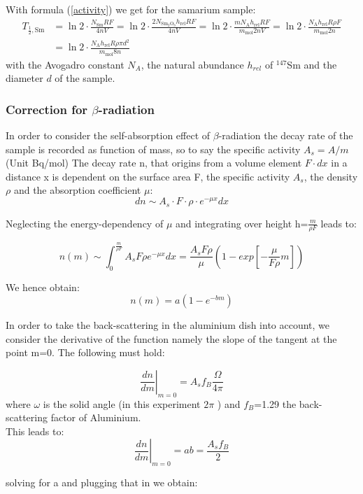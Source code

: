 \documentclass[12pt]{article}
\begin{document}
With formula (\ref{activity}) we get for the samarium sample:
\begin{align}
	T_{\frac12,\text{Sm}}&=\ln2\cdot\frac{N_{\text{Sm}}RF}{4nV}=\ln2\cdot\frac{2N_{\text{Sm$_2$O$_3$}}h_{\text{rel}}RF}{4nV}=\ln2\cdot\frac{mN_{\text{A}}h_{\text{rel}}RF}{m_{\text{mol}}2nV}
	=\ln2\cdot\frac{N_{\text{A}}h_{\text{rel}}R\rho F}{m_{\text{mol}}2n}\\&
	 =\ln2\cdot\frac{N_{\text{A}}h_{\text{rel}}R\rho\pi d^2}{m_{\text{mol}}8n}\label{halflifeSm}
\end{align}
with the Avogadro constant $N_A$, the natural abundance $h_{rel}$ of $^{147}$Sm and the diameter $d$ of the sample.

\subsubsection{Correction for $\beta$-radiation}\label{betacorrection}

In order to consider the self-absorption effect of $\beta$-radiation the decay rate of the sample is recorded as function of mass, so to say the specific activity  $A_s=A/m$ (Unit Bq/mol)
The decay rate n, that origins from a volume element $F\cdot dx$ in a distance x is dependent on the surface area F, the specific activity $A_s$, the density $\rho$ and the absorption coefficient  $\mu$:  
\[dn\sim A_s\cdot F\cdot \rho\cdot e^{-\mu x}dx\]

Neglecting the energy-dependency of $\mu$ and integrating over height  h=$\frac{m}{\rho F}$ leads to:

\[n(m)\sim\int_{0}^{\frac{m}{\rho F}}A_s F\rho e^{-\mu x}dx = \frac{A_s F\rho}{\mu}\left( 1-exp\left[ -\frac{\mu}{F\rho}m\right] \right)\]

We hence obtain:
\[n(m)= a\left( 1-e^{-bm}\right)\]

In order to take the back-scattering in the aluminium dish into account, we consider the derivative of the function namely the slope of the tangent at the point m=0. The following must hold: 

\[\left. \frac{dn}{dm}\right| _{m=0}=A_s f_B \frac{\Omega}{4\pi}\]
where $\omega$ is the solid angle (in this experiment $2\pi$ )  and $f_B$=1.29 the back-scattering factor of Aluminium.\\

This leads to:
\[\left. \frac{dn}{dm}\right| _{m=0} = ab = \frac{A_s f_B}{2}\]

solving for a and plugging that in we obtain:
\end{document}
